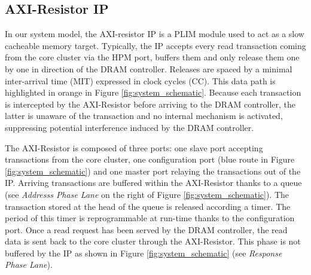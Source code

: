     \subsection{AXI-Resistor IP}
        \label{subsec:axi-resistor}
        In our system model, the AXI-resistor IP is a PLIM module \cite{PLIM20} used to act as a slow cacheable memory target.
        Typically, the IP accepts every read transaction coming from the core cluster via the HPM port, buffers them and only release them one by one in direction of the DRAM controller.
        Releases are spaced by a minimal inter-arrival time (MIT) expressed in clock cycles (CC).
        This data path is highlighted in orange in Figure \ref{fig:system_schematic}.
        Because each transaction is intercepted by the AXI-Resistor before arriving to the DRAM controller, the latter is unaware of the transaction and no internal mechanism is activated, suppressing potential interference induced by the DRAM controller.

        The AXI-Resistor is composed of three ports: one slave port accepting transactions from the core cluster, one configuration port (blue route in Figure \ref{fig:system_schematic}) and one master port relaying the transactions out of the IP.
        Arriving transactions are buffered within the AXI-Resistor thanks to a queue (see \emph{Addresss Phase Lane} on the right of Figure \ref{fig:system_schematic}).
        The transaction stored at the head of the queue is released according a timer.
        The period of this timer is reprogrammable at run-time thanks to the configuration port.
        Once a read request has been served by the DRAM controller, the read data is sent back to the core cluster through the AXI-Resistor.
        This phase is not buffered by the IP as shown in Figure \ref{fig:system_schematic} (see \emph{Response Phase Lane}).
